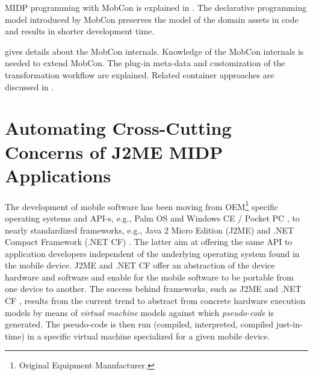 MIDP programming with MobCon is explained in . The declarative programming model introduced by MobCon preserves the model of the domain assets in code and results in shorter development time.

 gives details about the MobCon internals. Knowledge of the  MobCon internals is needed to extend MobCon. The plug-in meta-data and customization of the transformation workflow are explained. Related container approaches are discussed in .

\section{Automating Cross-Cutting Concerns of J2ME MIDP Applications}
\label{sec.mc.Intro}


\label{c2sec:mobile}
\label{c2.j2me}

The development of mobile software has been moving from OEM\footnote{Original Equipment Manufacturer.} specific operating systems and API-s, e.g., Palm OS \cite{palm} and Windows CE / Pocket PC \cite{wce.2003,PocketPC}, to nearly standardized frameworks, e.g., Java 2 Micro Edition (J2ME) \cite{www.j2me} and .NET Compact Framework (.NET CF) \cite{dnet.compact}. The latter aim at offering the same API to application developers independent of the underlying operating system found in the mobile device. J2ME and .NET CF offer an abstraction of the device hardware and software and enable for the mobile software to be portable from one device to another.
%
The success behind frameworks, such as J2ME \cite{www.j2me} and .NET CF \cite{dnet.compact}, results from the current trend to abstract from concrete hardware execution models by means of \textit{virtual machine} models against which \textit{pseudo-code} is generated. The pseudo-code is then run (compiled, interpreted, compiled just-in-time) in a specific virtual machine specialized for a given mobile device.

